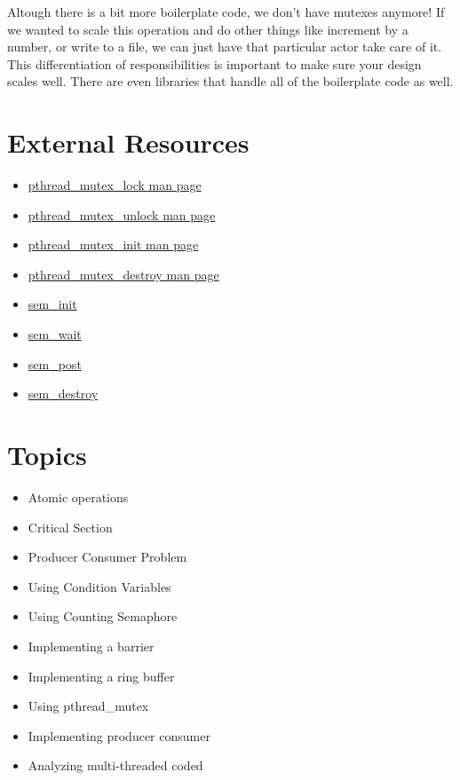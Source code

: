 Altough there is a bit more boilerplate code, we don't have mutexes anymore!
If we wanted to scale this operation and do other things like increment by a number, or write to a file, we can just have that particular actor take care of it.
This differentiation of responsibilities is important to make sure your design scales well.
There are even libraries that handle all of the boilerplate code as well.

\section{External Resources}

\begin{itemize}
\item \href{http://linux.die.net/man/3/pthread_mutex_lock}{pthread\_mutex\_lock man page}
\item \href{http://linux.die.net/man/3/pthread_mutex_unlock}{pthread\_mutex\_unlock man page}
\item \href{http://linux.die.net/man/3/pthread_mutex_init}{pthread\_mutex\_init man page}
\item \href{http://linux.die.net/man/3/pthread_mutex_destroy}{pthread\_mutex\_destroy man page}
\item \href{http://man7.org/linux/man-pages/man3/sem_init.3.html}{sem\_init}
\item \href{http://man7.org/linux/man-pages/man3/sem_wait.3.html}{sem\_wait}
\item \href{http://man7.org/linux/man-pages/man3/sem_post.3.html}{sem\_post}
\item \href{http://man7.org/linux/man-pages/man3/sem_destroy.3.html}{sem\_destroy}
\end{itemize}


\section{Topics}

\begin{itemize}
\tightlist
\item
  Atomic operations
\item
  Critical Section
\item
  Producer Consumer Problem
\item
  Using Condition Variables
\item
  Using Counting Semaphore
\item
  Implementing a barrier
\item
  Implementing a ring buffer
\item
  Using pthread\_mutex
\item
  Implementing producer consumer
\item
  Analyzing multi-threaded coded
\end{itemize}

